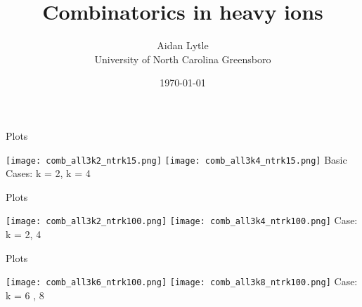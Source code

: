 \documentclass[aspectratio=169,compress,10pt]{beamer} %
\title[\today~-~Slide \insertframenumber]{Combinatorics in heavy ions}
\author[UNCG]{Aidan Lytle \\ University of North Carolina Greensboro}
\date{\today}
\begin{document}
\begin{frame}
\titlepage
\end{frame}





\begin{frame}{Plots}
\begin{adjustwidth}{-2em}{-2em}
\texttt{[image: comb\_all3k2\_ntrk15.png]}
\texttt{[image: comb\_all3k4\_ntrk15.png]}
Basic Cases: k = 2, k = 4
\end{adjustwidth}
\end{frame}




\begin{frame}{Plots}
\begin{adjustwidth}{-2em}{-2em}
\texttt{[image: comb\_all3k2\_ntrk100.png]}
\texttt{[image: comb\_all3k4\_ntrk100.png]}
Case: k = 2, 4
\end{adjustwidth}
\end{frame}

\begin{frame}{Plots}
\begin{adjustwidth}{-2em}{-2em}
\texttt{[image: comb\_all3k6\_ntrk100.png]}
\texttt{[image: comb\_all3k8\_ntrk100.png]}
Case: k = 6 , 8
\end{adjustwidth}
\end{frame}
\end{document}
